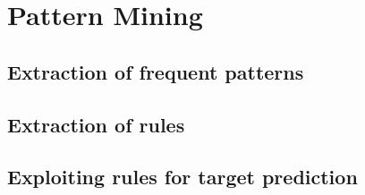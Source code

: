 \chapter{Pattern Mining}
\label{ch:capitolo2}

\section{Extraction of frequent patterns}\label{sec:freq_patterns}


\section{Extraction of rules}\label{sec:rules}



\section{Exploiting rules for target prediction}\label{sec:prediction_rules}
